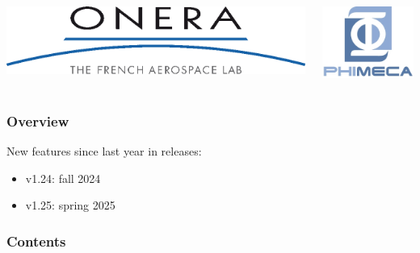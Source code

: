 \documentclass[aspectratio=169]{beamer}
\begin{document}
\begin{frame}
\begin{columns}
  \begin{center}
\includegraphics[height=0.05\textheight]{figures/onera-logo.png}
\end{center}

  \begin{center}
\includegraphics[height=0.08\textheight]{figures/logo-phimeca.png}
\end{center}


  \end{columns}

  \end{frame}

\begin{frame}
\frametitle{Overview}

New features since last year in releases:

\begin{itemize}
\item v1.24: fall 2024
\item v1.25: spring 2025
\end{itemize}

\end{frame}
  

\begin{frame}
\frametitle{Contents}
\tableofcontents
\end{frame}

\end{document}
